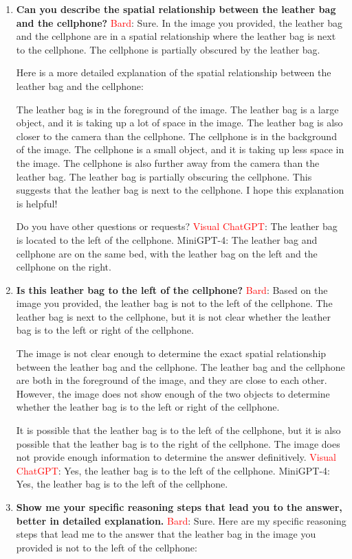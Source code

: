 \begin{enumerate}
    \item \textbf{Can you describe the spatial relationship between the leather bag and the cellphone?}
    \subitem \textcolor{Red}{Bard}: 
    Sure. In the image you provided, the leather bag and the cellphone are in a spatial relationship where the leather bag is next to the cellphone. The cellphone is partially obscured by the leather bag.
    
    Here is a more detailed explanation of the spatial relationship between the leather bag and the cellphone:
    
    The leather bag is in the foreground of the image. The leather bag is a large object, and it is taking up a lot of space in the image. The leather bag is also closer to the camera than the cellphone.
    The cellphone is in the background of the image. The cellphone is a small object, and it is taking up less space in the image. The cellphone is also further away from the camera than the leather bag.
    The leather bag is partially obscuring the cellphone. This suggests that the leather bag is next to the cellphone.
    I hope this explanation is helpful!
    
    Do you have other questions or requests?
    \subitem \textcolor{red}{Visual ChatGPT}: The leather bag is located to the left of the cellphone.
    \subitem MiniGPT-4: The leather bag and cellphone are on the same bed, with the leather bag on the left and the cellphone on the right.
    \item \textbf{Is this leather bag to the left of the cellphone?}
    \subitem \textcolor{Red}{Bard}:
    Based on the image you provided, the leather bag is not to the left of the cellphone. The leather bag is next to the cellphone, but it is not clear whether the leather bag is to the left or right of the cellphone.

    The image is not clear enough to determine the exact spatial relationship between the leather bag and the cellphone. The leather bag and the cellphone are both in the foreground of the image, and they are close to each other. However, the image does not show enough of the two objects to determine whether the leather bag is to the left or right of the cellphone.

    It is possible that the leather bag is to the left of the cellphone, but it is also possible that the leather bag is to the right of the cellphone. The image does not provide enough information to determine the answer definitively.
    \subitem \textcolor{red}{Visual ChatGPT}: Yes, the leather bag is to the left of the cellphone.
    \subitem MiniGPT-4: Yes, the leather bag is to the left of the cellphone.
    \item \textbf{Show me your specific reasoning steps that lead you to the answer, better in detailed explanation.}
    \subitem \textcolor{Red}{Bard}: Sure. Here are my specific reasoning steps that lead me to the answer that the leather bag in the image you provided is not to the left of the cellphone:


\end{enumerate}
